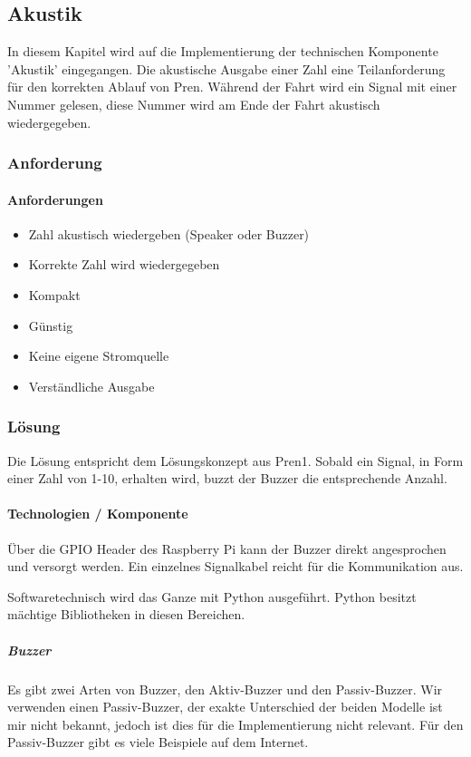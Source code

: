 \documentclass[../../main.tex]{subfiles}
\begin{document}
\subsection{Akustik}
In diesem Kapitel wird auf die Implementierung der technischen Komponente 'Akustik' eingegangen. Die akustische Ausgabe einer Zahl eine Teilanforderung für den korrekten Ablauf von Pren. Während der Fahrt wird ein Signal mit einer Nummer gelesen, diese Nummer wird am Ende der Fahrt akustisch wiedergegeben.

\subsubsection{Anforderung}

\paragraph{Anforderungen}
\begin{itemize}
    \item Zahl akustisch wiedergeben (Speaker oder Buzzer)
    \item Korrekte Zahl wird wiedergegeben
    \item Kompakt
    \item Günstig
    \item Keine eigene Stromquelle
    \item Verständliche Ausgabe
\end{itemize}

\subsubsection{Lösung}
Die Lösung entspricht dem Lösungskonzept aus Pren1. Sobald ein Signal, in Form einer Zahl von 1-10, erhalten wird, buzzt der Buzzer die entsprechende Anzahl.

\paragraph{Technologien / Komponente}
Über die GPIO Header des Raspberry Pi kann der Buzzer direkt angesprochen und versorgt werden. Ein einzelnes Signalkabel reicht für die Kommunikation aus.

Softwaretechnisch wird das Ganze mit Python ausgeführt. Python besitzt mächtige Bibliotheken in diesen Bereichen.

\subparagraph{Buzzer}
Es gibt zwei Arten von Buzzer, den Aktiv-Buzzer und den Passiv-Buzzer. Wir verwenden einen Passiv-Buzzer, der exakte Unterschied der beiden Modelle ist mir nicht bekannt, jedoch ist dies für die Implementierung nicht relevant. Für den Passiv-Buzzer gibt es viele Beispiele auf dem Internet. 
\end{document}
